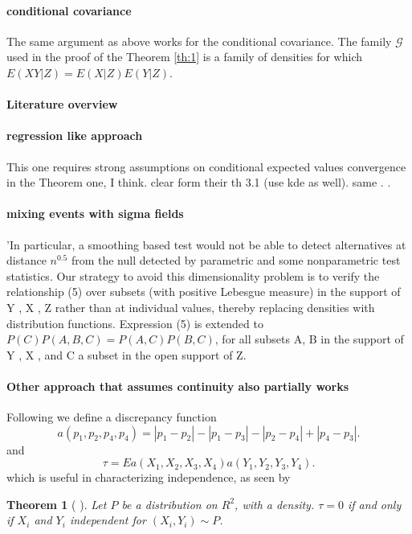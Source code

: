 \documentclass{article}
\newtheorem{Theorem}{Theorem}
\begin{document}
\paragraph{conditional covariance}
The same argument as above works for the conditional covariance. The family $\mathcal G$ used in the proof of the Theorem \ref{th:1} is a family of densities for which $E(XY|Z)=E(X|Z)E(Y|Z)$. 

\paragraph{Literature overview}

\paragraph{regression like approach}
This one \cite{song2007testing} requires strong assumptions on conditional  expected values convergence in the Theorem one, I think. \cite{su2008nonparametric} clear form their th 3.1 (use kde as well). same \cite{fukumizu2007kernel,zhang2012kernel}.
\cite{huang2010testing}.


\paragraph{mixing events with sigma fields}
\cite{gyorfi2012strongly}


\cite{linton1996conditional} 'In particular, a smoothing based test would not be able to detect
alternatives at distance $n^{0.5}$ from the null detected by parametric and
some nonparametric test statistics.
Our strategy to avoid this dimensionality problem is to verify the
relationship (5) over subsets (with positive Lebesgue measure) in the
support of Y , X , Z rather than at individual values, thereby replacing
densities with distribution functions. Expression (5) is extended to
$P (C )P (A,B, C ) = P (A,C )P (B,C )$,
for all subsets A, B in the support of Y , X , and C a subset in the open
support of Z.



\paragraph{Other approach that assumes continuity also partially works}

Following \cite{bergsma2014consistent} we define a discrepancy function
\begin{equation}
a(p_1,p_2,p_4,p_4) = |p_1-p_2| -|p_1-p_3|-|p_2-p_4|+|p_4-p_3|.
\end{equation}
and 
\begin{equation}
\tau = Ea(X_1,X_2,X_3,X_4)a(Y_1,Y_2,Y_3,Y_4).
\end{equation}
which is useful in characterizing independence, as seen by 
\begin{Theorem}[\cite{bergsma2014consistent} ]
\label{th:tau_star}
Let $P$ be a distribution on $R^2$, with a density.  $\tau = 0$ if and only if $X_i$ and $Y_i$ independent for  $(X_i,Y_i) \sim P$. 
\end{Theorem}
\end{document}

